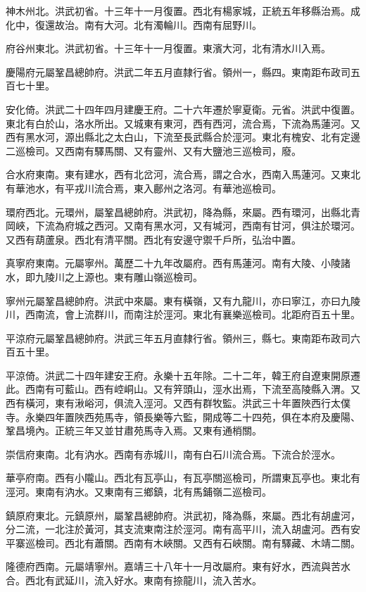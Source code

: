 神木州北。洪武初省。十三年十一月復置。西北有楊家城，正統五年移縣治焉。成化中，復還故治。南有大河。北有濁輪川。西南有屈野川。

府谷州東北。洪武初省。十三年十一月復置。東濱大河，北有清水川入焉。

慶陽府元屬鞏昌總帥府。洪武二年五月直隸行省。領州一，縣四。東南距布政司五百七十里。

安化倚。洪武二十四年四月建慶王府。二十六年遷於寧夏衛。元省。洪武中復置。東北有白於山，洛水所出。又城東有東河，西有西河，流合焉，下流為馬蓮河。又西有黑水河，源出縣北之太白山，下流至長武縣合於涇河。東北有槐安、北有定邊二巡檢司。又西南有驛馬關、又有靈州、又有大鹽池三巡檢司，廢。

合水府東南。東有建水，西有北岔河，流合焉，謂之合水，西南入馬蓮河。又東北有華池水，有平戎川流合焉，東入鄜州之洛河。有華池巡檢司。

環府西北。元環州，屬鞏昌總帥府。洪武初，降為縣，來屬。西有環河，出縣北青岡峽，下流為府城之西河。又南有黑水河，又有堿河，西南有甘河，俱注於環河。又西有葫蘆泉。西北有清平關。西北有安邊守禦千戶所，弘治中置。

真寧府東南。元屬寧州。萬歷二十九年改屬府。西有馬蓮河。南有大陵、小陵諸水，即九陵川之上源也。東有雕山嶺巡檢司。

寧州元屬鞏昌總帥府。洪武中來屬。東有橫嶺，又有九龍川，亦曰寧江，亦曰九陵川，西南流，會上流群川，而南注於涇河。東北有襄樂巡檢司。北距府百五十里。

平涼府元屬鞏昌總帥府。洪武三年五月直隸行省。領州三，縣七。東南距布政司六百五十里。

平涼倚。洪武二十四年建安王府。永樂十五年除。二十二年，韓王府自遼東開原遷此。西南有可藍山。西有崆峒山。又有笄頭山，涇水出焉，下流至高陵縣入渭。又西有橫河，東有湫峪河，俱流入涇河。又西有群牧監。洪武三十年置陜西行太僕寺。永樂四年置陜西苑馬寺，領長樂等六監，開成等二十四苑，俱在本府及慶陽、鞏昌境內。正統三年又並甘肅苑馬寺入焉。又東有通梢關。

崇信府東南。北有汭水。西南有赤城川，南有白石川流合焉。下流合於涇水。

華亭府南。西有小隴山。西北有瓦亭山，有瓦亭關巡檢司，所謂東瓦亭也。東北有涇河。東南有汭水。又東南有三鄉鎮，北有馬鋪嶺二巡檢司。

鎮原府東北。元鎮原州，屬鞏昌總帥府。洪武初，降為縣，來屬。西北有胡盧河，分二流，一北注於黃河，其支流東南注於涇河。南有高平川，流入胡盧河。西有安平寨巡檢司。西北有蕭關。西南有木峽關。又西有石峽關。南有驛藏、木靖二關。

隆德府西南。元屬靖寧州。嘉靖三十八年十一月改屬府。東有好水，西流與苦水合。西北有武延川，流入好水。東南有捺龍川，流入苦水。

